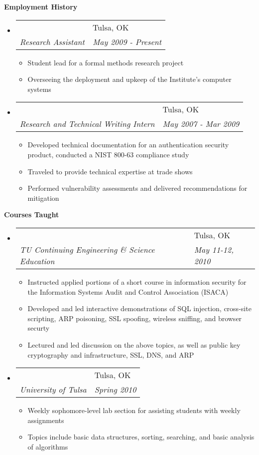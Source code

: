 \documentclass[letterpaper,11pt]{article}
\makeatletter
\newcommand{\resitem}[1]{\item \parbox[t]{4.6in}{#1} \vspace{-2pt}}
\newcommand{\resheading}[1]{{\large \colorbox{mygrey}{\begin{minipage}
    {\textwidth}{\textbf{#1 \vphantom{p\^{E}}}}\end{minipage}}}}
\newcommand{\ressubheading}[4]{
\begin{tabular*}{6.5in}[t]{l@{\extracolsep{\fill}}l}
		\textbf{\parbox[t]{4.5in}{\raggedright #1 }} & \parbox[b]{1.5in}{#2} \\
		\textit{#3} & \textit{#4} \\
\end{tabular*}\vspace{-6pt}}
\makeatother
\begin{document}

\resheading{Employment History}
\begin{itemize}
\item
	\ressubheading{Institute for Information Security at the University of Tulsa}{Tulsa, OK}{Research Assistant}{May 2009 - Present}
	\begin{itemize}
		\resitem{Student lead for a formal methods research project}
		\resitem{Overseeing the deployment and upkeep of the Institute's computer systems}
	\end{itemize}

\item
	\ressubheading{Vidoop}{Tulsa, OK}{Research and Technical Writing Intern}{May 2007 - Mar 2009}
	\begin{itemize}
		\resitem{Developed technical documentation for an authentication security product, conducted a NIST 800-63 compliance study}
		\resitem{Traveled to provide technical expertise at trade shows}
		\resitem{Performed vulnerability assessments and delivered recommendations for mitigation}
	\end{itemize}
\end{itemize}

\resheading{Courses Taught}
\begin{itemize}

\item
	\ressubheading{Information Security -- Assurance and Risk Assessment}{Tulsa, OK}{TU Continuing Engineering \& Science Education}{May 11-12, 2010}
	\begin{itemize}
		\resitem{Instructed applied portions of a short course in information security for the Information Systems Audit and Control Association (ISACA)}
		\resitem{Developed and led interactive demonstrations of SQL injection, cross-site scripting, ARP poisoning, SSL spoofing, wireless sniffing, and browser securty}
		\resitem{Lectured and led discussion on the above topics, as well as public key cryptography and infrastructure, SSL, DNS, and ARP}
	\end{itemize}

\item
	\ressubheading{Fundamentals of Algorithms and Computer Applications Lab}{Tulsa, OK}{University of Tulsa}{Spring 2010}
	\begin{itemize}
		\resitem{Weekly sophomore-level lab section for assisting students with weekly assignments}
		\resitem{Topics include basic data structures, sorting, searching, and basic analysis of algorithms}
	\end{itemize}
\end{itemize}
\end{document}
